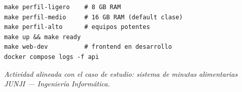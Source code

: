 \documentclass[12pt,a4paper]{article}
\begin{document}
\begin{lstlisting}[style=shellstyle]
make perfil-ligero    # 8 GB RAM
make perfil-medio     # 16 GB RAM (default clase)
make perfil-alto      # equipos potentes
make up && make ready
make web-dev          # frontend en desarrollo
docker compose logs -f api
\end{lstlisting}

\vfill
\begin{center}
\small
\textit{Actividad alineada con el caso de estudio: sistema de minutas alimentarias
JUNJI --- Ingeniería Informática.}
\end{center}
\end{document}
